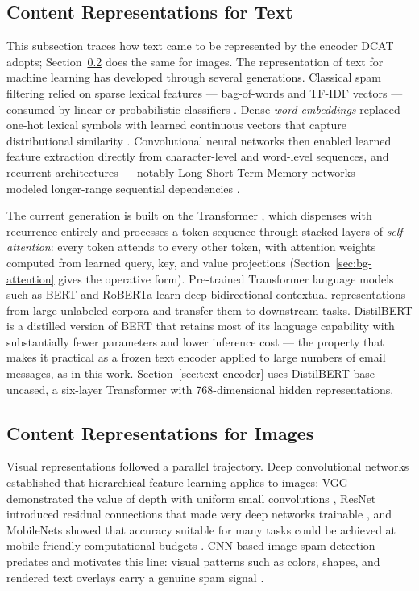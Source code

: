\documentclass[10pt,twoside]{article}
\begin{document}
\subsection{Content Representations for Text}\label{sec:bg-text}

This subsection traces how text came to be represented by the encoder DCAT adopts; Section~\ref{sec:bg-image} does the same for images. The representation of text for machine learning has developed through several generations. Classical spam filtering relied on sparse lexical features --- bag-of-words and TF-IDF vectors --- consumed by linear or probabilistic classifiers \citep{janez2023review}. Dense \emph{word embeddings} replaced one-hot lexical symbols with learned continuous vectors that capture distributional similarity \citep{mikolov2013word}. Convolutional neural networks then enabled learned feature extraction directly from character-level \citep{zhang2015charcnn} and word-level \citep{kim2014cnn} sequences, and recurrent architectures --- notably Long Short-Term Memory networks --- modeled longer-range sequential dependencies \citep{hochreiter1997lstm}.

The current generation is built on the Transformer \citep{vaswani2017attention}, which dispenses with recurrence entirely and processes a token sequence through stacked layers of \emph{self-attention}: every token attends to every other token, with attention weights computed from learned query, key, and value projections (Section~\ref{sec:bg-attention} gives the operative form). Pre-trained Transformer language models such as BERT \citep{devlin2019bert} and RoBERTa \citep{liu2019roberta} learn deep bidirectional contextual representations from large unlabeled corpora and transfer them to downstream tasks. DistilBERT \citep{sanh2019distilbert} is a distilled version of BERT that retains most of its language capability with substantially fewer parameters and lower inference cost --- the property that makes it practical as a frozen text encoder applied to large numbers of email messages, as in this work. Section~\ref{sec:text-encoder} uses DistilBERT-base-uncased, a six-layer Transformer with 768-dimensional hidden representations.

\subsection{Content Representations for Images}\label{sec:bg-image}

Visual representations followed a parallel trajectory. Deep convolutional networks established that hierarchical feature learning applies to images: VGG demonstrated the value of depth with uniform small convolutions \citep{simonyan2015vgg}, ResNet introduced residual connections that made very deep networks trainable \citep{he2016resnet}, and MobileNets showed that accuracy suitable for many tasks could be achieved at mobile-friendly computational budgets \citep{howard2017mobilenets}. CNN-based image-spam detection predates and motivates this line: visual patterns such as colors, shapes, and rendered text overlays carry a genuine spam signal \citep{annadatha2018image}.
\end{document}
